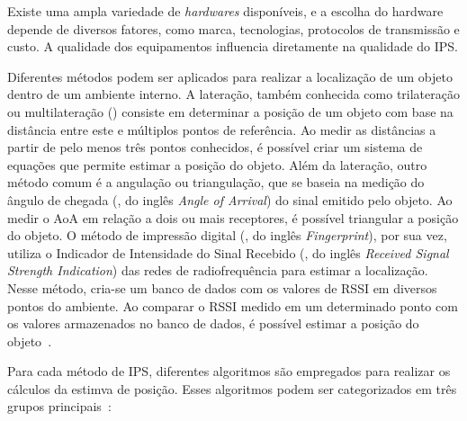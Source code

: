 Existe uma ampla variedade de \textit{hardwares} disponíveis, e a escolha do hardware depende de diversos fatores, como marca, tecnologias, protocolos de transmissão e custo. A qualidade dos equipamentos influencia diretamente na qualidade do IPS.

Diferentes métodos podem ser aplicados para realizar a localização de um objeto dentro de um ambiente interno. A lateração, também conhecida como trilateração ou multilateração () consiste em determinar a posição de um objeto com base na distância entre este e múltiplos pontos de referência. Ao medir as distâncias a partir de pelo menos três pontos conhecidos, é possível criar um sistema de equações que permite estimar a posição do objeto. Além da lateração, outro método comum é a angulação ou triangulação, que se baseia na medição do ângulo de chegada (, do inglês \textit{Angle of Arrival}) do sinal emitido pelo objeto. Ao medir o AoA em relação a dois ou mais receptores, é possível triangular a posição do objeto. O método de impressão digital (, do inglês \textit{Fingerprint}), por sua vez, utiliza o Indicador de Intensidade do Sinal Recebido (, do inglês \textit{Received Signal Strength Indication}) das redes de radiofrequência para estimar a localização. Nesse método, cria-se um banco de dados com os valores de RSSI em diversos pontos do ambiente. Ao comparar o RSSI medido em um determinado ponto com os valores armazenados no banco de dados, é possível estimar a posição do objeto~\cite{Farahsari2022}.

Para cada método de IPS, diferentes algoritmos são empregados para realizar os cálculos da estimva de posição. Esses algoritmos podem ser categorizados em três grupos principais~\cite{Farahsari2022}:

